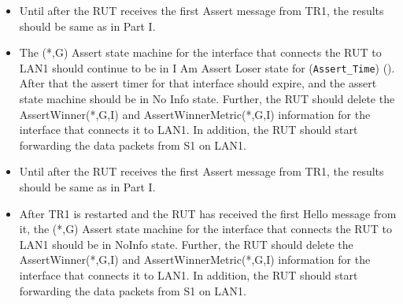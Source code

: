 \documentclass[11pt]{report}
\begin{document}

\begin{itemize}

  \item Until after the RUT receives the first Assert message from TR1, the
  results should be same as in Part I.

  \item The (*,G) Assert state machine for the interface that connects the RUT
  to LAN1 should continue to be in I Am Assert Loser state for
  (\verb=Assert_Time=) ({\PimsmAssertTime}). After that the assert timer for
  that interface should expire, and the assert state machine should be in No
  Info state.
  Further, the RUT should delete the AssertWinner(*,G,I) and
  AssertWinnerMetric(*,G,I) information for the interface that connects it to
  LAN1.
  In addition, the RUT should start forwarding the data packets from S1 on
  LAN1.

\end{itemize}


\begin{itemize}

  \item Until after the RUT receives the first Assert message from TR1, the
  results should be same as in Part I.

  \item After TR1 is restarted and the RUT has received the first Hello
  message from it, the (*,G) Assert state machine for the
  interface that connects the RUT to LAN1 should be in NoInfo state.
  Further, the RUT should delete the AssertWinner(*,G,I) and
  AssertWinnerMetric(*,G,I) information for the interface that connects it to
  LAN1.
  In addition, the RUT should start forwarding the data packets from S1 on
  LAN1.

\end{itemize}

\end{document}
